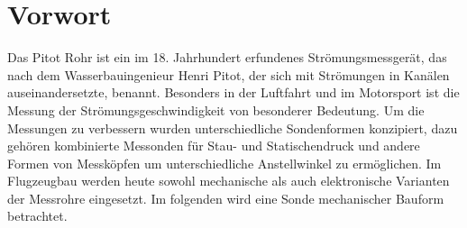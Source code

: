 \section{Vorwort}
Das Pitot Rohr ist ein im 18. Jahrhundert erfundenes Strömungsmessgerät, das nach dem Wasserbauingenieur Henri Pitot, der sich mit Strömungen in Kanälen auseinandersetzte, benannt. Besonders in der Luftfahrt und im Motorsport ist die Messung der Strömungsgeschwindigkeit von besonderer Bedeutung. Um die Messungen zu verbessern wurden unterschiedliche Sondenformen konzipiert, dazu gehören kombinierte Messonden für Stau- und Statischendruck und andere Formen von Messköpfen um unterschiedliche Anstellwinkel zu ermöglichen. Im Flugzeugbau werden heute sowohl mechanische als auch elektronische Varianten der Messrohre eingesetzt. Im folgenden wird eine Sonde mechanischer Bauform betrachtet.
